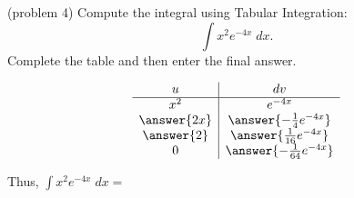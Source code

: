\documentclass{ximera}
\begin{document}
\begin{problem}(problem 4)
Compute the integral using Tabular Integration:
  \[
  \int x^2 e^{-4x} \;dx.
  \]
Complete the table and then enter the final answer.
\begin{center}
\[
\begin{array}{c|c}
		u & dv  \\\hline 
		x^2 & e^{-4x} \\  
      \answer{2x} & \answer{-\frac14 e^{-4x}} \\ 
       \answer{2} & \answer{\frac{1}{16} e^{-4x}} \\
       0 & \answer{-\frac{1}{64} e^{-4x}} 
	\end{array}
    \]
\end{center}



Thus, $\displaystyle{  \int x^2 e^{-4x} \;dx = }$
  \begin{multipleChoice}
\end{multipleChoice}
  
\end{problem}
\end{document}
